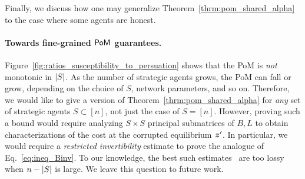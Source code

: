Finally, we discuss how one may generalize Theorem~\ref{thrm:pom_shared_alpha} to the case where some agents are honest. 

\paragraph{Towards fine-grained $\mathsf{PoM}$ guarantees.} Figure~\ref{fig:ratios_susceptibility_to_persuation} shows that the PoM is {\em not} monotonic in $\lvert S\rvert$. As the number of strategic agents grows, the PoM can fall or grow, depending on the choice of $S$, network parameters, and so on. Therefore, we would like to give a version of Theorem~\ref{thrm:pom_shared_alpha} for {\em any} set of strategic agents $S \subset [n]$, not just the case of $S = [n]$. However, proving such a bound would require analyzing $S \times S$ principal submatrices of $B, L$ to obtain characterizations of the cost at the corrupted equilibrium $\bm{z}^\prime$. In particular, we would require a {\em restricted invertibility} estimate to prove the analogue of Eq.~\eqref{eq:ineq_Binv}. To our knowledge, the best such estimates~\citep{marcus2022interlacing} are too lossy when $n - \lvert S\rvert$ is large. We leave this question to future work. 










